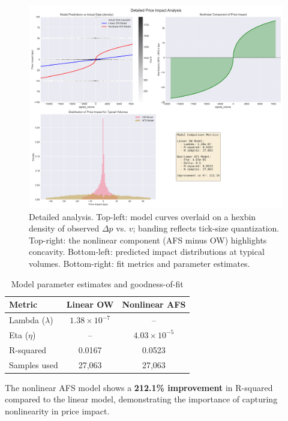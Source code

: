 \documentclass{article}
\begin{document}
\begin{figure}[H]
  \centering
  \includegraphics[width=\textwidth]{figures/03_detailed_analysis.png}
  \caption{Detailed analysis. Top-left: model curves overlaid on a hexbin density of observed $\Delta p$ vs. $v$; banding reflects tick-size quantization. Top-right: the nonlinear component (AFS minus OW) highlights concavity. Bottom-left: predicted impact distributions at typical volumes. Bottom-right: fit metrics and parameter estimates.}
  \label{fig:detailed}
  \end{figure}
  

\begin{table}[h]
\centering
\begin{tabular}{lcc}
\toprule
\textbf{Metric} & \textbf{Linear OW} & \textbf{Nonlinear AFS} \\
\midrule
Lambda ($\lambda$) & $1.38 \times 10^{-7}$ & -- \\
Eta ($\eta$) & -- & $4.03 \times 10^{-5}$ \\
R-squared & 0.0167 & 0.0523 \\
Samples used & 27,063 & 27,063 \\
\bottomrule
\end{tabular}
\caption{Model parameter estimates and goodness-of-fit}
\end{table}

The nonlinear AFS model shows a \textbf{212.1\% improvement} in R-squared compared to the linear model, demonstrating the importance of capturing nonlinearity in price impact.
\end{document}

